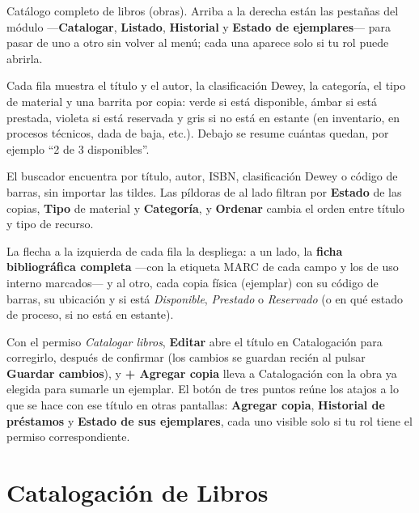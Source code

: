 \documentclass[11pt,a4paper]{report}
\begin{document}
Catálogo completo de libros (obras). Arriba a la derecha están las
pestañas del módulo ---\textbf{Catalogar}, \textbf{Listado},
\textbf{Historial} y \textbf{Estado de ejemplares}--- para pasar de uno a
otro sin volver al menú; cada una aparece solo si tu rol puede abrirla.

Cada fila muestra el título y el autor, la clasificación Dewey, la
categoría, el tipo de material y una barrita por copia: verde si está
disponible, ámbar si está prestada, violeta si está reservada y gris si
no está en estante (en inventario, en procesos técnicos, dada de baja,
etc.). Debajo se resume cuántas quedan, por ejemplo ``2 de 3
disponibles''.

El buscador encuentra por título, autor, ISBN, clasificación Dewey o
código de barras, sin importar las tildes. Las píldoras de al lado
filtran por \textbf{Estado} de las copias, \textbf{Tipo} de material y
\textbf{Categoría}, y \textbf{Ordenar} cambia el orden entre título y
tipo de recurso.


La flecha a la izquierda de cada fila la despliega: a un lado, la
\textbf{ficha bibliográfica completa} ---con la etiqueta MARC de cada
campo y los de uso interno marcados--- y al otro, cada copia física
(ejemplar) con su código de barras, su ubicación y si está
\emph{Disponible}, \emph{Prestado} o \emph{Reservado} (o en qué estado de
proceso, si no está en estante).


Con el permiso \textit{Catalogar libros}, \textbf{Editar} abre el título
en Catalogación para corregirlo, después de confirmar (los cambios se
guardan recién al pulsar \textbf{Guardar cambios}), y \textbf{+ Agregar
copia} lleva a Catalogación con la obra ya elegida para sumarle un
ejemplar. El botón de tres puntos reúne los atajos a lo que se hace con
ese título en otras pantallas: \textbf{Agregar copia}, \textbf{Historial
de préstamos} y \textbf{Estado de sus ejemplares}, cada uno visible solo
si tu rol tiene el permiso correspondiente.

\section{Catalogación de Libros}

\end{document}
